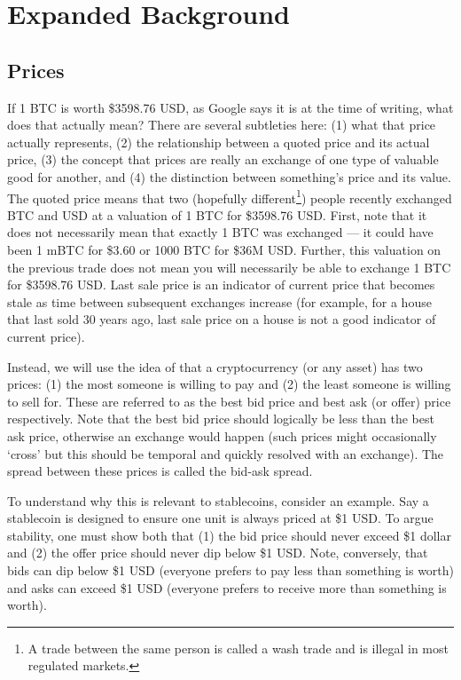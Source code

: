 
\clearpage
\appendix

\section{Expanded Background}

\subsection{Prices}

If 1 BTC is worth \$3598.76 USD, as Google says it is at the time of writing, what does that actually mean? There are several subtleties here: (1) what that price actually represents, (2) the relationship between a quoted price and its actual price, (3) the concept that prices are really an exchange of one type of valuable good for another, and (4) the distinction between something's price and its value. The quoted price means that two (hopefully different\footnote{A trade between the same person is called a wash trade and is illegal in most regulated markets.}) people recently exchanged BTC and USD at a valuation of 1 BTC for \$3598.76 USD. First, note that it does not necessarily mean that exactly 1 BTC was exchanged --- it could have been 1 mBTC for \$3.60 or 1000 BTC for \$36M USD. Further, this valuation on the previous trade does not mean you will necessarily be able to exchange 1 BTC for \$3598.76 USD. Last sale price is an indicator of current price that becomes stale as time between subsequent exchanges increase (for example, for a house that last sold 30 years ago, last sale price on a house is not a good indicator of current price).

Instead, we will use the idea of that a cryptocurrency (or any asset) has two prices: (1) the most someone is willing to pay and (2) the least someone is willing to sell for. These are referred to as the best bid price and best ask (or offer) price respectively. Note that the best bid price should logically be less than the best ask price, otherwise an exchange would happen (such prices might occasionally `cross' but this should be temporal and quickly resolved with an exchange). The spread between these prices is called the bid-ask spread.

To understand why this is relevant to stablecoins, consider an example. Say a stablecoin is designed to ensure one unit is always priced at \$1 USD. To argue stability, one must show both that (1) the bid price should never exceed \$1 dollar and (2) the offer price should never dip below \$1 USD. Note, conversely, that bids can dip below \$1 USD (everyone prefers to pay less than something is worth) and asks can exceed \$1 USD (everyone prefers to receive more than something is worth).

